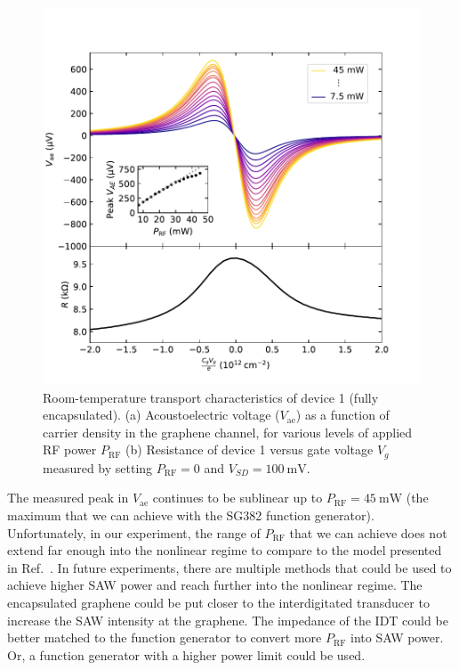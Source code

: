 \documentclass{beavtex_dub_edit}
\begin{document}
\begin{figure}
    \includegraphics[width = 1\textwidth]{AEV V3 power series plot_output.pdf}
    \caption[Room-temperature transport characteristics of device 1 (fully encapsulated).]{Room-temperature transport characteristics of device 1 (fully encapsulated). (a) Acoustoelectric voltage ($V_{\mathrm{ae}}$) as a function of carrier density in the graphene channel, for various levels of applied RF power $P_{\mathrm{RF}}$ (b) Resistance of device 1 versus gate voltage $V_g$ measured by setting $P_{\mathrm{RF}} = 0$ and $V_{SD} = \SI{100}{\milli\volt}$.}
    \label{AEV nonlinear series}
\end{figure}
The measured peak in $V_{\mathrm{ae}}$ continues to be sublinear up to $P_{\mathrm{RF}} = \SI{45}{\milli\watt}$ (the maximum that we can achieve with the SG382 function generator). Unfortunately, in our experiment, the range of $P_{\mathrm{RF}}$ that we can achieve does not extend far enough into the nonlinear regime to compare to the model presented in Ref.\ \cite{rotter_nonlinear_1999}. In future experiments, there are multiple methods that could be used to achieve higher SAW power and reach further into the nonlinear regime. The encapsulated graphene could be put closer to the interdigitated transducer to increase the SAW intensity at the graphene. The impedance of the IDT could be better matched to the function generator to convert more $P_{\mathrm{RF}}$ into SAW power. Or, a function generator with a higher power limit could be used.
\end{document}
